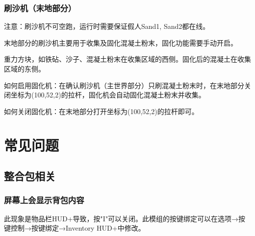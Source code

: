 \documentclass[UTF8,a4paper]{article}
\begin{document}
			\subsubsection{刷沙机（末地部分）}
				\par 注意：刷沙机不可空跑，运行时需要保证假人Sand1, Sand2都在线。
				\par 末地部分的刷沙机主要用于收集及固化混凝土粉末，固化功能需要手动开启。
				\par 重力方块，如铁砧、沙子、混凝土粉末在收集区域的西侧。固化后的混凝土在收集区域的东侧。
				\par 如何启用固化机：在确认刷沙机（主世界部分）只刷混凝土粉末时，在末地部分关闭坐标为(100,52,2)的拉杆，固化机会自动固化混凝土粉末并收集。
				\par 如何关闭固化机：在末地部分打开坐标为(100,52,2)的拉杆即可。
			\subsubsection{}
	\section{常见问题}
		\subsection{整合包相关}
			\subsubsection{屏幕上会显示背包内容}
				\par 此现象是物品栏HUD+导致，按"I"可以关闭。此模组的按键绑定可以在选项→按键控制→按键绑定→Inventory HUD+中修改。
\end{document}
